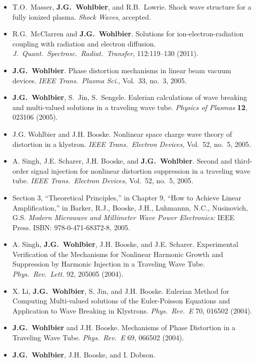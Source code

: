 \documentclass[12pt]{article}
\begin{document}
\begin{itemize}
\item T.O.~Masser, \textbf{J.G.~Wohlbier}, and R.B.~Lowrie. Shock wave structure
  for a fully ionized plasma. {\it Shock Waves}, accepted.
\item R.G.~McClarren and \textbf{J.G.~Wohlbier}. Solutions for
  ion-electron-radiation coupling with radiation and electron
  diffusion. {\it J.~Quant.~Spectrosc.~Radiat.~Transfer}, 112:119--130
  (2011).
\item \textbf{J.G.~Wohlbier}. Phase distortion mechanisms in linear beam
  vacuum devices. {\it IEEE Trans.~Plasma Sci.}, Vol.~33, no.~3,
  2005.
\item \textbf{J.G.~Wohlbier}, S.~Jin, S.~Sengele. Eulerian calculations of
  wave breaking and multi-valued solutions in a traveling wave
  tube. {\it Physics of Plasmas} {\bf 12}, 023106 (2005).
\item J.G. Wohlbier and J.H. Booske. Nonlinear space charge wave theory
  of distortion in a klystron. {\it IEEE Trans.~Electron Devices,}
  Vol.~52, no.~5, 2005.
\item A. Singh, J.E. Scharer, J.H. Booske, and \textbf{J.G.~Wohlbier}.
  Second and third-order signal injection for nonlinear
  distortion suppression in a traveling wave tube. {\it IEEE
    Trans.~Electron Devices,} Vol.~52, no.~5, 2005.
\item Section 3, ``Theoretical Principles,'' in Chapter 9,
  ``How to Achieve Linear Amplification,'' in Barker, R.J., Booske,
  J.H., Luhmannn, N.C., Nusinovich, G.S.
  {\it Modern Microwave and Millimeter Wave Power Electronics:} IEEE
  Press. ISBN: 978-0-471-68372-8, 2005.
\item A. Singh, \textbf{J.G.~Wohlbier}, J.H. Booske, and
  J.E. Scharer. Experimental Verification of the Mechanisms for
  Nonlinear Harmonic Growth and Suppression by Harmonic Injection in a
  Traveling Wave Tube. {\it Phys.~Rev.~Lett.} 92, 205005 (2004).
\item X. Li, \textbf{J.G.~Wohlbier}, S. Jin, and J.H. Booske.
  Eulerian Method for Computing Multi-valued solutions of the Euler-Poisson
  Equations and Application to Wave Breaking in Klystrons.
  {\it Phys.~Rev.~E} 70, 016502 (2004).
\item \textbf{J.G.~Wohlbier} and J.H. Booske.
  Mechanisms of Phase Distortion in a Traveling Wave Tube.
  {\it Phys.~Rev.~E} 69, 066502 (2004).
\item \textbf{J.G.~Wohlbier}, J.H. Booske, and I. Dobson.

\end{itemize}
\end{document}
